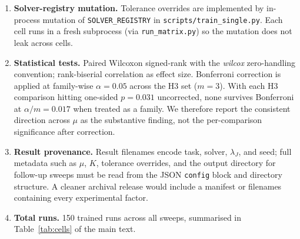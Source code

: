 \begin{enumerate}[leftmargin=2em]
\item \textbf{Solver-registry mutation.} Tolerance overrides are implemented
by in-process mutation of \texttt{SOLVER\_REGISTRY} in
\texttt{scripts/train\_single.py}. Each cell runs in a fresh subprocess
(via \texttt{run\_matrix.py}) so the mutation does not leak across cells.
\item \textbf{Statistical tests.} Paired Wilcoxon signed-rank with the
\emph{wilcox} zero-handling convention; rank-biserial correlation as effect
size. Bonferroni correction is applied at family-wise $\alpha = 0.05$
across the H3 set ($m = 3$). With each H3 comparison hitting one-sided
$p = 0.031$ uncorrected, none survives Bonferroni at $\alpha/m = 0.017$
when treated as a family. We therefore report the consistent direction
across $\mu$ as the substantive finding, not the per-comparison
significance after correction.
\item \textbf{Result provenance.} Result filenames encode task, solver,
$\lambda_J$, and seed; full metadata such as $\mu$, $K$, tolerance overrides,
and the output directory for follow-up sweeps must be read from the JSON
\texttt{config} block and directory structure. A cleaner archival release
would include a manifest or filenames containing every experimental factor.
\item \textbf{Total runs.} 150 trained runs across all sweeps,
summarised in Table~\ref{tab:cells} of the main text.
\end{enumerate}
